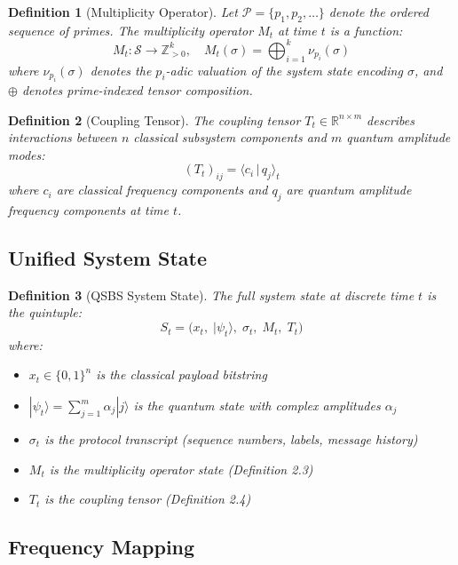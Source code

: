 \documentclass[11pt,letterpaper]{article}
\newtheorem{definition}{Definition}[section]
\begin{document}
\begin{definition}[Multiplicity Operator]
Let \(\mathcal{P} = \{p_1, p_2, \ldots\}\) denote the ordered sequence of primes.
The multiplicity operator \(M_t\) at time \(t\) is a function:
\[
  M_t : \mathcal{S} \to \mathbb{Z}_{>0}^k, \quad
  M_t(\sigma) = \bigoplus_{i=1}^{k} \nu_{p_i}(\sigma) \tag{3}
\]
where \(\nu_{p_i}(\sigma)\) denotes the \(p_i\)-adic valuation of the system state
encoding \(\sigma\), and \(\oplus\) denotes prime-indexed tensor composition.
\end{definition}

\begin{definition}[Coupling Tensor]
The coupling tensor \(T_t \in \mathbb{R}^{n \times m}\) describes interactions
between \(n\) classical subsystem components and \(m\) quantum amplitude modes:
\[
  (T_t)_{ij} = \langle c_i \,|\, q_j \rangle_t \tag{4}
\]
where \(c_i\) are classical frequency components and \(q_j\) are quantum amplitude
frequency components at time \(t\).
\end{definition}

\subsection{Unified System State}

\begin{definition}[QSBS System State]
The full system state at discrete time \(t\) is the quintuple:
\[
  S_t = \bigl(x_t,\; |\psi_t\rangle,\; \sigma_t,\; M_t,\; T_t\bigr) \tag{5}
\]
where:
\begin{itemize}
  \item \(x_t \in \{0,1\}^n\) is the classical payload bitstring
  \item \(|\psi_t\rangle = \sum_{j=1}^{m} \alpha_j |j\rangle\) is the quantum state
        with complex amplitudes \(\alpha_j\)
  \item \(\sigma_t\) is the protocol transcript (sequence numbers, labels, message history)
  \item \(M_t\) is the multiplicity operator state (Definition 2.3)
  \item \(T_t\) is the coupling tensor (Definition 2.4)
\end{itemize}
\end{definition}

\subsection{Frequency Mapping}
\end{document}
